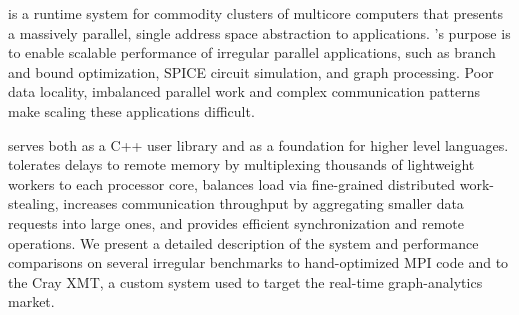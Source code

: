 \Grappa is a runtime system for commodity clusters of multicore computers that
presents a massively parallel, single address space abstraction to
applications. \Grappa's purpose is to enable scalable performance of irregular
parallel applications, such as  branch and bound optimization, SPICE circuit simulation, and graph processing. Poor data locality,
imbalanced parallel work and complex communication patterns make scaling these
applications difficult.

\Grappa serves both as a C++ user library and as a foundation for higher level
languages. \Grappa tolerates delays to remote memory by multiplexing thousands
of lightweight workers to each processor core, balances load via fine-grained
distributed work-stealing, increases communication throughput by aggregating
smaller data requests into large ones, and provides efficient synchronization
and remote operations. We present a detailed description of the \Grappa system
and performance comparisons on several irregular benchmarks to hand-optimized
MPI code and to the Cray XMT, a custom system used to target the real-time
graph-analytics market.
